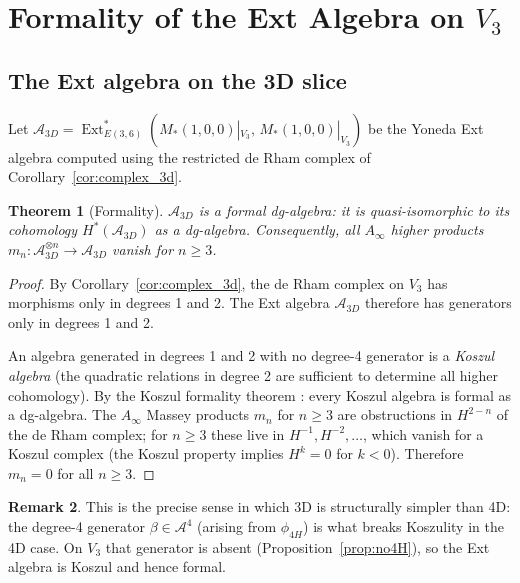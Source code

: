 \documentclass[reqno,10pt]{amsart}
\theoremstyle{plain}
\newtheorem{theorem}{Theorem}[section]
\theoremstyle{definition}
\newtheorem{remark}[theorem]{Remark}
\def\Ext{\operatorname{Ext}}
\def\gEiii{E(3,6)}
\begin{document}
\section{Formality of the Ext Algebra on $V_3$}\label{sec:formality}

\subsection{The Ext algebra on the 3D slice}

Let $\mathcal{A}_{3D} = \Ext^*_{\gEiii}(M_*(1,0,0)|_{V_3},\,M_*(1,0,0)|_{V_3})$
be the Yoneda Ext algebra computed using the restricted de Rham complex
of Corollary~\ref{cor:complex_3d}.

\begin{theorem}[Formality]\label{thm:formal}
  $\mathcal{A}_{3D}$ is a formal dg-algebra: it is quasi-isomorphic to its
  cohomology $H^*(\mathcal{A}_{3D})$ as a dg-algebra.  Consequently, all
  $A_\infty$ higher products $m_n: \mathcal{A}_{3D}^{\otimes n} \to \mathcal{A}_{3D}$
  vanish for $n \geq 3$.
\end{theorem}

\begin{proof}
  By Corollary~\ref{cor:complex_3d}, the de Rham complex on $V_3$ has
  morphisms only in degrees 1 and 2.  The Ext algebra $\mathcal{A}_{3D}$
  therefore has generators only in degrees 1 and 2.

  An algebra generated in degrees 1 and 2 with no degree-4 generator is
  a \emph{Koszul algebra} (the quadratic relations in degree 2 are sufficient
  to determine all higher cohomology).  By the Koszul formality theorem
  \cite{BGS1996}: every Koszul algebra is formal as a dg-algebra.
  The $A_\infty$ Massey products $m_n$ for $n \geq 3$ are obstructions
  in $H^{2-n}$ of the de Rham complex; for $n \geq 3$ these live in
  $H^{-1}, H^{-2}, \ldots$, which vanish for a Koszul complex
  (the Koszul property implies $H^k = 0$ for $k < 0$).
  Therefore $m_n = 0$ for all $n \geq 3$.
\end{proof}

\begin{remark}
  This is the precise sense in which 3D is structurally simpler than 4D:
  the degree-4 generator $\beta \in \mathcal{A}^4$ (arising from $\phi_{4H}$)
  is what breaks Koszulity in the 4D case.  On $V_3$ that generator is absent
  (Proposition~\ref{prop:no4H}), so the Ext algebra is Koszul and hence formal.
\end{remark}
\end{document}
